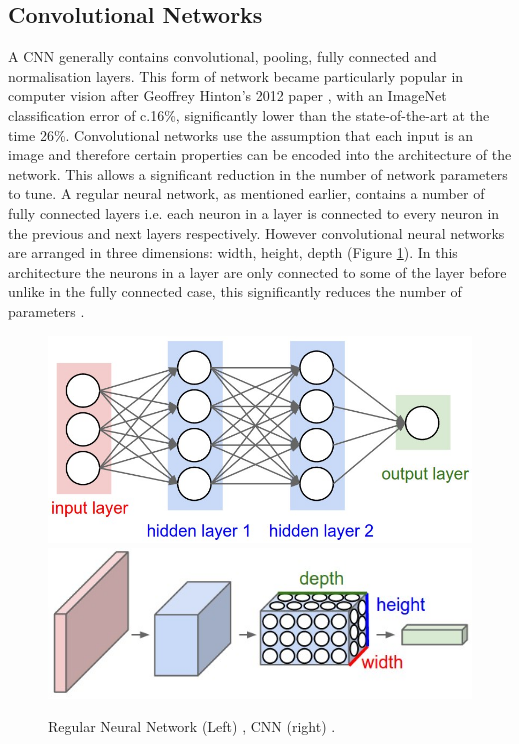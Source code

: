 \documentclass[a4paper,11pt,notitlepage]{article}
\begin{document}
\subsection{Convolutional Networks} \label{Cnn_section}
A CNN generally contains convolutional, pooling, fully connected and normalisation layers. This form of network became particularly popular in computer vision after Geoffrey Hinton's 2012 paper \cite{GH_CNN}, with an ImageNet classification error of c.16\%, significantly lower than the state-of-the-art at the time 26\%. Convolutional networks use the assumption that each input is an image and therefore certain properties can be encoded into the architecture of the network. This allows a significant reduction in the number of network parameters to tune.
\newline \newline
A regular neural network, as mentioned earlier, contains a number of fully connected layers i.e. each neuron in a layer is connected to every neuron in the previous and next layers respectively. However convolutional neural networks are arranged in three dimensions: width, height, depth (Figure \ref{CNNvsNN}). In this architecture the neurons in a layer are only connected to some of the layer before unlike in the fully connected case, this significantly reduces the number of parameters \cite{StanfordCS231_1}.

\noindent \begin{figure}[h!]
\includegraphics[width = 0.5\hsize]{./figures/neural_net2.jpeg}
\includegraphics[width = 0.5\hsize]{./figures/cnn.jpeg}
\caption{Regular Neural Network (Left) \cite{StanfordCS231_1} , CNN (right) \cite{StanfordCS231_1}.}
\label{CNNvsNN}
\end{figure}
\end{document}
